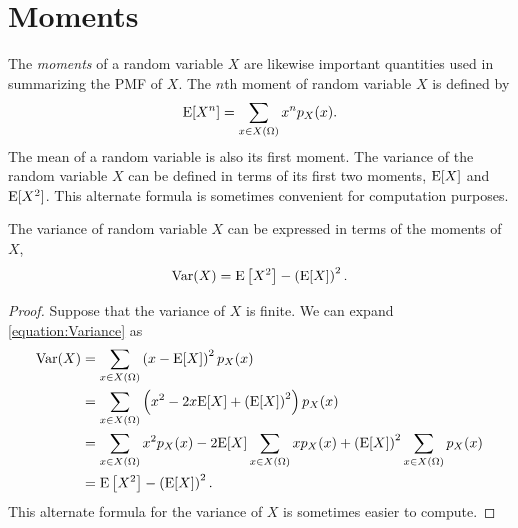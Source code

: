 \section{Moments}

The \emph{moments} of a random variable $X$ are likewise important quantities used in summarizing the PMF of $X$.
The $n$th moment of random variable $X$ is defined by
\begin{equation*}
\mathrm{E} [X^n] = \sum_{x \in X(\Omega)} x^n p_X (x) .
\end{equation*}
The mean of a random variable is also its first moment.
The variance of the random variable $X$ can be defined in terms of its first two moments, $\mathrm{E} [X]$ and $\mathrm{E} [X^2]$.
This alternate formula is sometimes convenient for computation purposes.

\begin{theorem}
The variance of random variable $X$ can be expressed in terms of the moments of $X$,
\begin{equation*}
\mathrm{Var} (X) = \mathrm{E} \left[ X^2 \right] - \left( \mathrm{E} [X] \right)^2.
\end{equation*}
\end{theorem}
\begin{proof}
Suppose that the variance of $X$ is finite.
We can expand \eqref{equation:Variance} as
\begin{equation*}
\begin{split}
\mathrm{Var} (X) &= \sum_{x \in X(\Omega)} \left( x - \mathrm{E} [X] \right)^2 p_X (x) \\
&= \sum_{x \in X(\Omega)} \left( x^2 - 2 x \mathrm{E} [X] + \left( \mathrm{E} [X] \right)^2 \right) p_X (x) \\
&= \sum_{x \in X(\Omega)} x^2 p_X (x) - 2 \mathrm{E} [X] \sum_{x \in X(\Omega)} x p_X (x) + \left( \mathrm{E} [X] \right)^2 \sum_{x \in X(\Omega)} p_X (x) \\
&= \mathrm{E} \left[ X^2 \right] - \left( \mathrm{E} [X] \right)^2.
\end{split}
\end{equation*}
This alternate formula for the variance of $X$ is sometimes easier to compute.
\end{proof}

